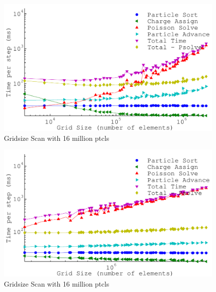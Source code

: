 \begin{figure}
\begin{center}
\includegraphics[width=6in]{performance/gridsize_scan16ptcls8bins.pdf}
\end{center}
\caption{Gridsize Scan with 16 million ptcls}
\label{fig:nptclsize_scan128x64x64}
\end{figure}

\begin{figure}
\begin{center}
\includegraphics[width=6in]{performance/gridsize_scan16ptcls16bins.pdf}
\end{center}
\caption{Gridsize Scan with 16 million ptcls}
\label{fig:nptclsize_scan128x64x64}
\end{figure}

